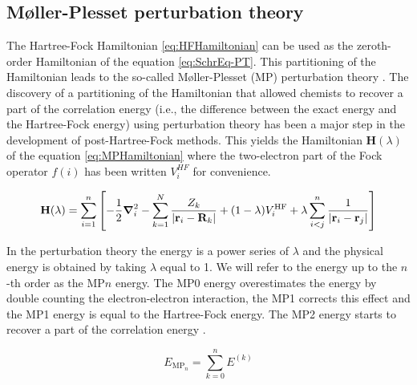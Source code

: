 \documentclass[11pt,a4paper]{article}
\newcommand{\bH}{\mathbf{H}}
\begin{document}
\subsection{M{\o}ller-Plesset perturbation theory}

The Hartree-Fock Hamiltonian \eqref{eq:HFHamiltonian} can be used as the zeroth-order Hamiltonian of the equation \eqref{eq:SchrEq-PT}. This partitioning of the Hamiltonian leads to the so-called M{\o}ller-Plesset (MP) perturbation theory \cite{Moller_1934}. The discovery of a partitioning of the Hamiltonian that allowed chemists to recover a part of the correlation energy (i.e., the difference between the exact energy and the Hartree-Fock energy) using perturbation theory has been a major step in the development of post-Hartree-Fock methods. This yields the Hamiltonian $\bH(\lambda)$ of the equation \eqref{eq:MPHamiltonian} where the two-electron part of the Fock operator $f(i)$ has been written $V_i^{HF}$ for convenience.

\begin{equation}\label{eq:MPHamiltonian}
    \bH(\lambda)=\sum\limits_{i=1}^{n}\left[-\frac{1}{2}\grad_i^2 - \sum\limits_{k=1}^{N} \frac{Z_k}{|\vb{r}_i-\vb{R}_k|} + (1-\lambda)V_i^{\text{HF}}+\lambda\sum\limits_{i<j}^{n}\frac{1}{|\vb{r}_i-\vb{r}_j|} \right]
\end{equation}

In the perturbation theory the energy is a power series of $\lambda$ and the physical energy is obtained by taking $\lambda$ equal to 1. We will refer to the energy up to the $n$-th order as the MP$n$ energy. The MP0 energy overestimates the energy by double counting the electron-electron interaction, the MP1 corrects this effect and the MP1 energy is equal to the Hartree-Fock energy. The MP2 energy starts to recover a part of the correlation energy \cite{SzaboBook}.

\begin{equation}
E_{\text{MP}_{n}}= \sum_{k=0}^n E^{(k)}
\end{equation}
\end{document}
